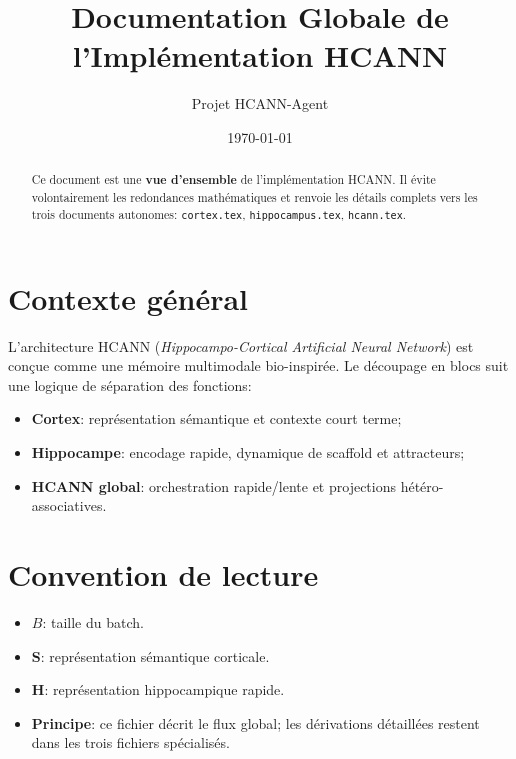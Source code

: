 \documentclass[12pt,a4paper]{article}
\title{Documentation Globale de l'Implémentation HCANN}
\author{Projet HCANN-Agent}
\date{\today}
\begin{document}
\maketitle

\begin{abstract}
Ce document est une \textbf{vue d'ensemble} de l'implémentation HCANN.  
Il évite volontairement les redondances mathématiques et renvoie les détails complets vers les trois documents autonomes: \texttt{cortex.tex}, \texttt{hippocampus.tex}, \texttt{hcann.tex}.
\end{abstract}

\tableofcontents
\newpage

\section{Contexte général}
L'architecture HCANN (\textit{Hippocampo-Cortical Artificial Neural Network}) est conçue comme une mémoire multimodale bio-inspirée.  
Le découpage en blocs suit une logique de séparation des fonctions:
\begin{itemize}[leftmargin=*]
    \item \textbf{Cortex}: représentation sémantique et contexte court terme;
    \item \textbf{Hippocampe}: encodage rapide, dynamique de scaffold et attracteurs;
    \item \textbf{HCANN global}: orchestration rapide/lente et projections hétéro-associatives.
\end{itemize}

\section{Convention de lecture}
\begin{itemize}[leftmargin=*]
    \item $B$: taille du batch.
    \item $\mathbf{S}$: représentation sémantique corticale.
    \item $\mathbf{H}$: représentation hippocampique rapide.
    \item \textbf{Principe}: ce fichier décrit le flux global; les dérivations détaillées restent dans les trois fichiers spécialisés.
\end{itemize}
\end{document}
